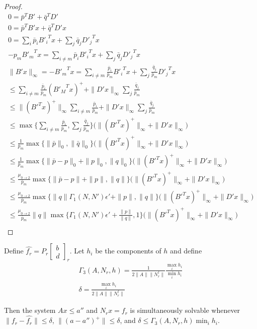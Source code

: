 \begin{proof}
\begin{align*}
0 = \bar p^TB' + \bar q^TD' \\
0 = \bar p^TB'x + \bar q^TD'x \\
0 = \sum_{i}\bar p_i {B'_i}^Tx + \sum_j\bar q_j{D'_j}^Tx \\
-p_m{B'_m}^Tx = \sum_{i\ne m}\bar p_i {B'_i}^Tx + \sum_j\bar q_j{D'_j}^Tx \\
\|B'x\|_{\infty} = -{B'_m}^Tx = \sum_{i\ne m} \frac{\bar p_i}{\bar p_m}{B'_i}^Tx + \sum_{j} \frac{\bar q_j}{\bar p_m}{D'_j}^Tx \\
\le \sum_{i\ne m} \frac{\bar p_i}{\bar p_m}({B'_M}^Tx)^+ + \|D'x\|_{\infty}\sum_{j} \frac{\bar q_j}{\bar p_m} \\
\le \|({B'}^Tx)^+\|_{\infty} \sum_{i\ne m} \frac{\bar p_i}{\bar p_m} + \|D'x\|_{\infty}\sum_{j} \frac{\bar q_j}{\bar p_m} \\
\le \max\big\{\sum_{i\ne m} \frac{\bar p_i}{\bar p_m}, \sum_{j} \frac{\bar q_j}{\bar p_m} \big\}\bigg(\|({B'}^Tx)^+\|_{\infty} + \|D'x\|_{\infty}\bigg) \\
\le \frac 1 {\bar p_m} \max\big\{\|\bar p\|_0, \|\bar q\|_0\big\}\bigg(\|({B'}^Tx)^+\|_{\infty} + \|D'x\|_{\infty}\bigg) \\
\le \frac 1 {\bar p_m} \max\big\{\|\bar p - p\|_0 + \|p\|_0, \|q\|_0\big\}\bigg(\|({B'}^Tx)^+\|_{\infty} + \|D'x\|_{\infty}\bigg) \\
\le \frac {\mu_{0\to 2}} {\bar p_m} \max\big\{\|\bar p - p\| + \|p\|, \|q\|\big\}\bigg(\|({B'}^Tx)^+\|_{\infty} + \|D'x\|_{\infty}\bigg) \\
\le \frac {\mu_{0\to 2}} {\bar p_m} \max\big\{\|q\|\Gamma_1(N, N')\epsilon' + \|p\|, \|q\|\big\}\bigg(\|({B'}^Tx)^+\|_{\infty} + \|D'x\|_{\infty}\bigg) \\
\le \frac {\mu_{0\to 2}} {\bar p_m} \|q\|\max\big\{\Gamma_1(N, N')\epsilon' + \frac{\|p\|}{\|q\|}, 1\big\}\bigg(\|({B'}^Tx)^+\|_{\infty} + \|D'x\|_{\infty}\bigg) \\
\end{align*}



\end{proof}

\begin{theorem}
\label{4_1}
Define $\hat {f_r} = P_r \begin{bmatrix}b \\ d \end{bmatrix}_r $. 
Let $h_i$ be the components of $h$ and define
\begin{align*}
\Gamma_3(A, N_r, h) = \frac{1}{2\|A\|\|N_r^{\dagger}\|}\frac{\max_i h_i}{\min_ih_i} \\
\delta = \frac{\max_i h_i}{2\|A\|\|N_r^{\dagger}\|}
\end{align*}

Then the system $Ax \le a''$ and $N_rx = f_r$ is simultaneously solvable whenever
$\|f_r - \hat{f_r}\| \le \delta$, $\|(a - a'')^+\|\le \delta$, and $\delta \le \Gamma_3(A, N_r, h) \min_{i} h_i$.
\end{theorem}

